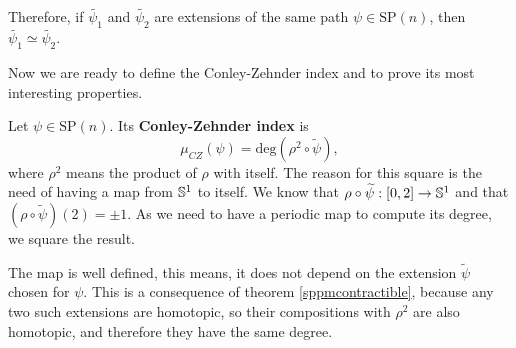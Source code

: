 Therefore, if $\widetilde{\psi_1}$ and $\widetilde{\psi_2}$ are extensions of the same path $\psi \in \text{SP}(n)$, then $\widetilde{\psi_1} \simeq \widetilde{\psi_2}$.

Now we are ready to define the Conley-Zehnder index and to prove its most interesting properties.

\begin{deff}
Let $\psi \in \text{SP}(n)$. Its {\bf Conley-Zehnder index} is
\[\mu_{CZ}(\psi) = \text{deg}(\rho^2 \circ \widetilde{\psi}) ,\]
where $\rho^2$ means the product of $\rho$ with itself. The reason for this square is the need of having a map from $\mathbb{S}^1$ to itself. We know that $\rho \circ \widetilde{\psi} : [0,2] \rightarrow \mathbb{S}^1$ and that $(\rho \circ \widetilde{\psi})(2) = \pm 1$. As we need to have a periodic map to compute its degree, we square the result.
\end{deff}

\begin{rmrk}
The map is well defined, this means, it does not depend on the extension $\widetilde{\psi}$ chosen for $\psi$. This is a consequence of theorem \ref{sppmcontractible}, because any two such extensions are homotopic, so their compositions with $\rho^2$ are also homotopic, and therefore they have the same degree.
\end{rmrk}

